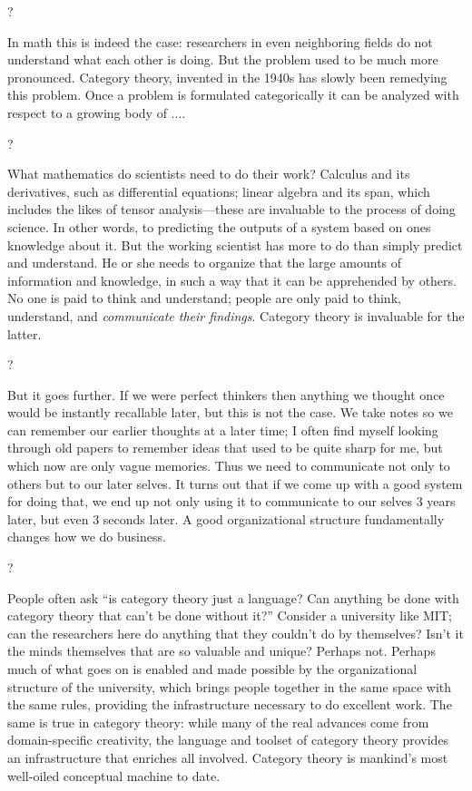 \documentclass[a4paper]{book}
\theoremstyle{myth}
\begin{document}
\begin{russian}
? 

In math this is indeed the case: researchers in even neighboring fields do not understand what each other is doing. But the problem used to be much more pronounced. Category theory, invented in the 1940s has slowly been remedying this problem. Once a problem is formulated categorically it can be analyzed with respect to a growing body of ....

? 

What mathematics do scientists need to do their work? Calculus and its derivatives, such as differential equations; linear algebra and its span, which includes the likes of tensor analysis---these are invaluable to the process of doing science. In other words, to predicting the outputs of a system based on ones knowledge about it. But the working scientist has more to do than simply predict and understand. He or she needs to organize that the large amounts of information and knowledge, in such a way that it can be apprehended by others. No one is paid to think and understand; people are only paid to think, understand, and {\em communicate their findings}. Category theory is invaluable for the latter.

? 

But it goes further. If we were perfect thinkers then anything we thought once would be instantly recallable later, but this is not the case. We take notes so we can remember our earlier thoughts at a later time; I often find myself looking through old papers to remember ideas that used to be quite sharp for me, but which now are only vague memories. Thus we need to communicate not only to others but to our later selves. It turns out that if we come up with a good system for doing that, we end up not only using it to communicate to our selves 3 years later, but even 3 seconds later. A good organizational structure fundamentally changes how we do business.

? 

People often ask “is category theory just a language? Can anything be done with category theory that can't be done without it?” Consider a university like MIT; can the researchers here do anything that they couldn't do by themselves? Isn't it the minds themselves that are so valuable and unique? Perhaps not. Perhaps much of what goes on is enabled and made possible by the organizational structure of the university, which brings people together in the same space with the same rules, providing the  infrastructure necessary to do excellent work. The same is true in category theory: while many of the real advances come from domain-specific creativity, the language and toolset of category theory provides an infrastructure that enriches all involved. Category theory is mankind's most well-oiled conceptual machine to date.


\end{russian}
\end{document}
